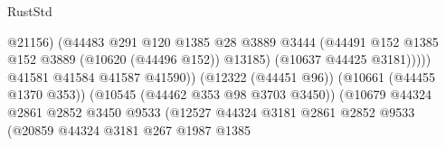 \begin{lexlean}{RustStd}
\begin{coremodule}
                                                            @21156)
                                                          (@44483
                                                            @291
                                                            @120
                                                            @1385
                                                            @28
                                                            @3889
                                                            @3444
                                                            (@44491
                                                              @152
                                                              @1385
                                                              @152
                                                              @3889
                                                              (@10620 (@44496 @152))
                                                              @13185)
                                                            (@10637 @44425 @3181)))))
                                                    @41581
                                                    @41584
                                                    @41587
                                                    @41590))
                                                (@12322 (@44451 @96))
                                                (@10661 (@44455 @1370 @353))
                                                (@10545 (@44462 @353 @98 @3703 @3450))
                                                (@10679
                                                  @44324
                                                  @2861
                                                  @2852
                                                  @3450
                                                  @9533
                                                  (@12527
                                                    @44324
                                                    @3181
                                                    @2861
                                                    @2852
                                                    @9533
                                                    (@20859
                                                      @44324
                                                      @3181
                                                      @267
                                                      @1987
                                                      @1385

\end{coremodule}
\end{lexlean}
